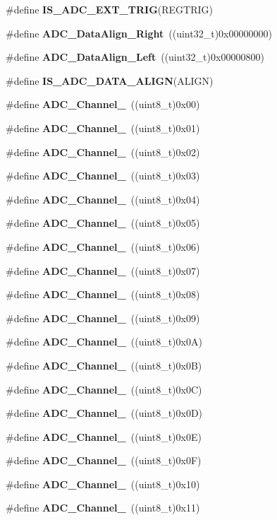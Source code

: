 \begin{DoxyCompactItemize}
\#define \textbf{ I\+S\+\_\+\+A\+D\+C\+\_\+\+E\+X\+T\+\_\+\+T\+R\+IG}(R\+E\+G\+T\+R\+IG)
\item 
\#define \textbf{ A\+D\+C\+\_\+\+Data\+Align\+\_\+\+Right}~((uint32\+\_\+t)0x00000000)
\item 
\#define \textbf{ A\+D\+C\+\_\+\+Data\+Align\+\_\+\+Left}~((uint32\+\_\+t)0x00000800)
\item 
\#define \textbf{ I\+S\+\_\+\+A\+D\+C\+\_\+\+D\+A\+T\+A\+\_\+\+A\+L\+I\+GN}(A\+L\+I\+GN)
\item 
\#define \textbf{ A\+D\+C\+\_\+\+Channel\+\_}~((uint8\+\_\+t)0x00)
\item 
\#define \textbf{ A\+D\+C\+\_\+\+Channel\+\_}~((uint8\+\_\+t)0x01)
\item 
\#define \textbf{ A\+D\+C\+\_\+\+Channel\+\_}~((uint8\+\_\+t)0x02)
\item 
\#define \textbf{ A\+D\+C\+\_\+\+Channel\+\_}~((uint8\+\_\+t)0x03)
\item 
\#define \textbf{ A\+D\+C\+\_\+\+Channel\+\_}~((uint8\+\_\+t)0x04)
\item 
\#define \textbf{ A\+D\+C\+\_\+\+Channel\+\_}~((uint8\+\_\+t)0x05)
\item 
\#define \textbf{ A\+D\+C\+\_\+\+Channel\+\_}~((uint8\+\_\+t)0x06)
\item 
\#define \textbf{ A\+D\+C\+\_\+\+Channel\+\_}~((uint8\+\_\+t)0x07)
\item 
\#define \textbf{ A\+D\+C\+\_\+\+Channel\+\_}~((uint8\+\_\+t)0x08)
\item 
\#define \textbf{ A\+D\+C\+\_\+\+Channel\+\_}~((uint8\+\_\+t)0x09)
\item 
\#define \textbf{ A\+D\+C\+\_\+\+Channel\+\_}~((uint8\+\_\+t)0x0\+A)
\item 
\#define \textbf{ A\+D\+C\+\_\+\+Channel\+\_}~((uint8\+\_\+t)0x0\+B)
\item 
\#define \textbf{ A\+D\+C\+\_\+\+Channel\+\_}~((uint8\+\_\+t)0x0\+C)
\item 
\#define \textbf{ A\+D\+C\+\_\+\+Channel\+\_}~((uint8\+\_\+t)0x0\+D)
\item 
\#define \textbf{ A\+D\+C\+\_\+\+Channel\+\_}~((uint8\+\_\+t)0x0\+E)
\item 
\#define \textbf{ A\+D\+C\+\_\+\+Channel\+\_}~((uint8\+\_\+t)0x0\+F)
\item 
\#define \textbf{ A\+D\+C\+\_\+\+Channel\+\_}~((uint8\+\_\+t)0x10)
\item 
\#define \textbf{ A\+D\+C\+\_\+\+Channel\+\_}~((uint8\+\_\+t)0x11)

\end{DoxyCompactItemize}
